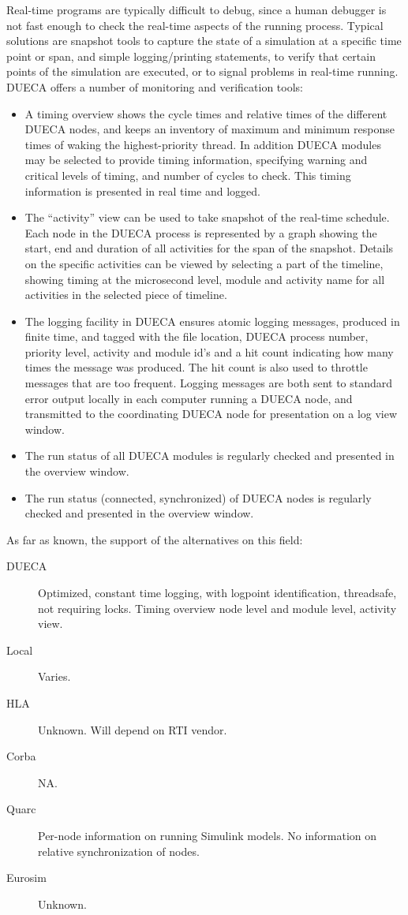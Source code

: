 \documentclass[11pt,a4paper,twoside]{scrreprt}
\begin{document}
Real-time programs are typically difficult to debug, since a human debugger is not fast enough to check the real-time aspects of the running process. Typical solutions are snapshot tools to capture the state of a simulation at a specific time point or span, and simple logging/printing statements, to verify that certain points of the simulation are executed, or to signal problems in real-time running. DUECA offers a number of monitoring and verification tools:
\begin{itemize}
\item A timing overview shows the cycle times and relative times of the different DUECA nodes, and keeps an inventory of maximum and minimum response times of waking the highest-priority thread. In addition DUECA modules may be selected to provide timing information, specifying warning and critical levels of timing, and number of cycles to check. This timing information is presented in real time and logged.
\item The ``activity'' view can be used to take snapshot of the real-time schedule. Each node in the DUECA process is represented by a graph showing the start, end and duration of all activities for the span of the snapshot. Details on the specific activities can be viewed by selecting a part of the timeline, showing timing at the microsecond level, module and activity name for all activities in the selected piece of timeline.
\item The logging facility in DUECA ensures atomic logging messages, produced in finite time, and tagged with the file location, DUECA process number, priority level,  activity and module id's and a hit count indicating how many times the message was produced. The hit count is also used to throttle messages that are too frequent. Logging messages are both sent to standard error output locally in each computer running a DUECA node, and transmitted to the coordinating DUECA node for presentation on a log view window.
\item The run status of all DUECA modules is regularly checked and presented in the overview window.
\item The run status (connected, synchronized) of DUECA nodes is regularly checked and presented in the overview window.
\end{itemize}

As far as known, the support of the alternatives on this field:

\begin{description}
\item[DUECA] Optimized, constant time logging, with logpoint identification, threadsafe, not requiring locks. Timing overview node level and module level, activity view.
\item[Local] Varies.
\item[HLA] Unknown. Will depend on RTI vendor.
\item[Corba] NA.
\item[Quarc] Per-node information on running Simulink models. No information on relative synchronization of nodes.
\item[Eurosim] Unknown.
\end{description}
\end{document}
